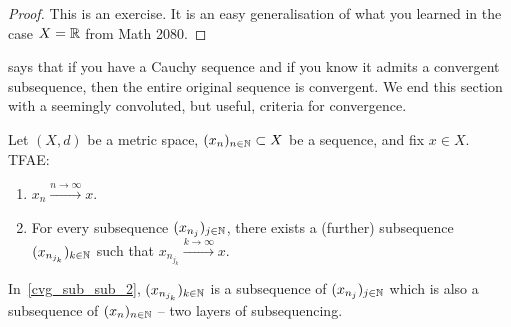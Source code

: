 \begin{proof}
This is an exercise. It is an easy generalisation of what you learned in the case $X = \mathbb{R}$ from Math 2080.
\end{proof}
 says that if you have a Cauchy sequence and if you know it admits a convergent subsequence, then the entire original sequence is convergent. We end this section with a seemingly convoluted, but useful, criteria for convergence.
\begin{lemma}
\label{lem:cvg_sub_sub}
Let $(X,d)$ be a metric space, $(x_n)_{n\in\mathbb{N}}\subset X$ be a sequence, and fix $x\in X$. TFAE:
\begin{enumerate}
	\item \label{cvg_sub_sub_1} $x_n \overset{n\to \infty}{\to}x$.
	\item \label{cvg_sub_sub_2} For every subsequence $(x_{n_j})_{j\in \mathbb{N}}$, there exists a (further) subsequence $(x_{n_{j_k}})_{k\in\mathbb{N}}$ such that $x_{n_{j_k}}\overset{k\to \infty}{\to}x$.
\end{enumerate}
\end{lemma}
In~\ref{cvg_sub_sub_2}, $(x_{n_{j_k}})_{k\in\mathbb{N}}$ is a subsequence of $(x_{n_j})_{j\in\mathbb{N}}$ which is also a subsequence of $(x_n)_{n\in\mathbb{N}}$ -- two layers of subsequencing.
